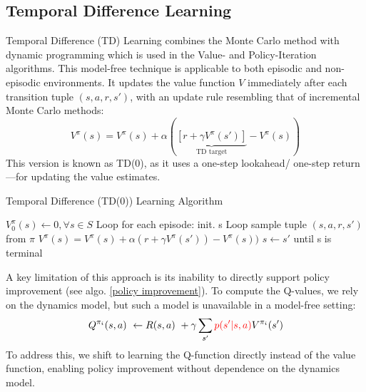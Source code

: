\subsection{Temporal Difference Learning}
Temporal Difference (TD) Learning combines the Monte Carlo method with dynamic programming 
which is used in the Value- and Policy-Iteration algorithms. This model-free technique is applicable
to both episodic and non-episodic environments. It updates the value function $V$ immediately after
each transition tuple $(s, a, r, s')$, with an update rule resembling that of incremental 
Monte Carlo methods:
$$V^{\pi}(s)= V^{\pi}(s) + \alpha(\underbrace{[r+ \gamma V^{\pi}(s')]}_{\text{TD target}}- V^{\pi}(s))$$
This version is known as TD(0), as it uses a one-step lookahead/ one-step return—for updating the value estimates.
\vspace{-0.2cm}
\begin{algorithm}[H]
    \caption{Temporal Difference (TD(0)) Learning Algorithm }\label{TD_learning_algo}
    \begin{algorithmic}
        \STATE $V_0^{\pi}(s)\gets 0, \forall s \in S$
        \STATE Loop for each episode:
        \STATE \quad init. s
        \STATE \quad Loop 
        \STATE \qquad sample tuple $(s,a,r,s')$ from $\pi$
        \STATE \qquad $V^{\pi}(s)= V^{\pi}(s) + \alpha(r+ \gamma V^{\pi}(s'))- 
        V^{\pi}(s))$
        \STATE \qquad $s \gets s'$
        \STATE \quad until s is terminal
    \end{algorithmic}
\end{algorithm}
A key limitation of this approach is its inability to directly support policy improvement 
(see algo. \ref{policy improvement}). To compute the Q-values, we rely on the dynamics model, 
but such a model is unavailable in a model-free setting:
$$Q^{\pi_i}(s,a) \ \gets R(s,a) \ + \gamma \sum_{s'}{\color{red}p(s'|s,a)} V^{\pi_i}(s')$$
To address this, we shift to learning the Q-function directly instead of the value function, 
enabling policy improvement without dependence on the dynamics model.

